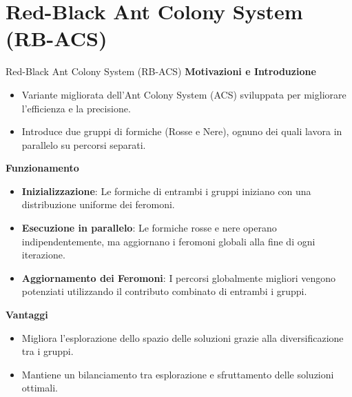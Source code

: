 \documentclass{beamer}
\begin{document}
\section{Red-Black Ant Colony System (RB-ACS)}
\begin{frame}{Red-Black Ant Colony System (RB-ACS)}
    \textbf{Motivazioni e Introduzione}
    \begin{itemize}
        \item Variante migliorata dell'Ant Colony System (ACS) sviluppata per migliorare l’efficienza e la precisione.
        \item Introduce due gruppi di formiche (Rosse e Nere), ognuno dei quali lavora in parallelo su percorsi separati.
    \end{itemize}

    \textbf{Funzionamento}
    \begin{itemize}
        \item \textbf{Inizializzazione}: Le formiche di entrambi i gruppi iniziano con una distribuzione uniforme dei feromoni.
        \item \textbf{Esecuzione in parallelo}: Le formiche rosse e nere operano indipendentemente, ma aggiornano i feromoni globali alla fine di ogni iterazione.
        \item \textbf{Aggiornamento dei Feromoni}: I percorsi globalmente migliori vengono potenziati utilizzando il contributo combinato di entrambi i gruppi.
    \end{itemize}

    \textbf{Vantaggi}
    \begin{itemize}
        \item Migliora l'esplorazione dello spazio delle soluzioni grazie alla diversificazione tra i gruppi.
        \item Mantiene un bilanciamento tra esplorazione e sfruttamento delle soluzioni ottimali.
    \end{itemize}


\end{frame}
\end{document}
